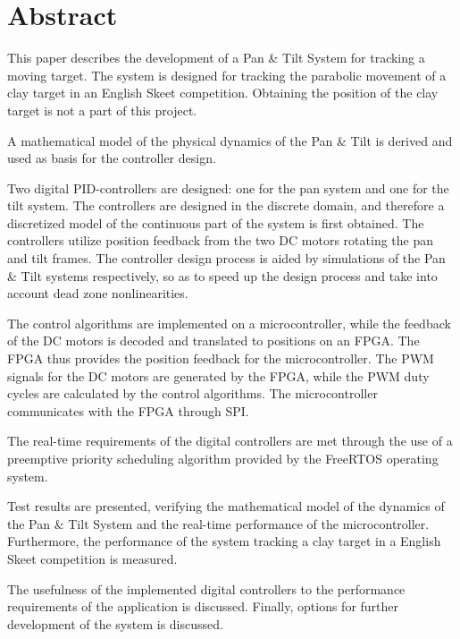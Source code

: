 
\setcounter{page}{1}
\section*{Abstract}
This paper describes the development of a Pan \& Tilt System for tracking a moving
target. The system is designed for tracking the parabolic movement of
a clay target in an English Skeet competition.
Obtaining the position of the clay target is not a part of this project. 

A mathematical model of the physical dynamics of the Pan \& Tilt is
derived and used as basis for the controller design.

Two digital PID-controllers are designed: one for the pan system and one for the tilt system.
The controllers are designed in the discrete domain, and therefore a discretized model
of the continuous part of the system is first obtained.
The controllers utilize position feedback from 
the two DC motors
rotating the pan and tilt frames.
The controller design process is aided by simulations of the Pan \& Tilt systems respectively,
so as to speed up the design process and take into account dead zone nonlinearities.

The control algorithms are implemented on a microcontroller, while
the feedback of the DC motors is decoded and translated to positions on an FPGA.
The FPGA thus provides the position feedback for the microcontroller.
The PWM signals for the DC motors are generated by the FPGA, while the PWM duty cycles are calculated by the control algorithms.
The microcontroller communicates with the FPGA through SPI.

The real-time requirements of the digital controllers are met through the use
of a preemptive priority scheduling algorithm provided by the FreeRTOS operating
system.

Test results are presented,
verifying the mathematical model of the dynamics of the Pan \& Tilt System
and the real-time performance of the microcontroller.
Furthermore, the performance of the system tracking a clay target in a English Skeet competition is measured.

The usefulness of the implemented digital controllers to the performance requirements
of the application is discussed. Finally, options for further development of the system is discussed. 

